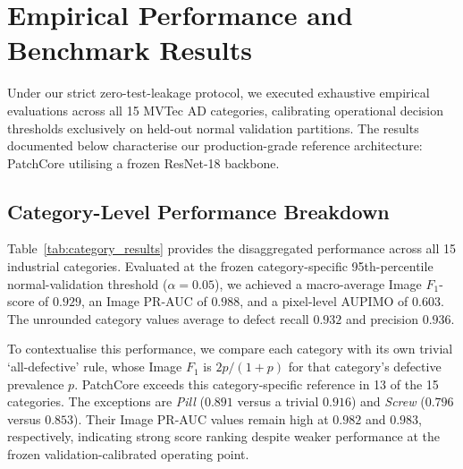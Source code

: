 \section{Empirical Performance and Benchmark Results}
\label{sec:empirical_results}

Under our strict zero-test-leakage protocol, we executed exhaustive empirical evaluations across all 15 MVTec AD categories, calibrating operational decision thresholds exclusively on held-out normal validation partitions. The results documented below characterise our production-grade reference architecture: PatchCore utilising a frozen ResNet-18 backbone.

\subsection{Category-Level Performance Breakdown}

Table~\ref{tab:category_results} provides the disaggregated performance across all 15 industrial categories. Evaluated at the frozen category-specific 95th-percentile normal-validation threshold ($\alpha=0.05$), we achieved a macro-average Image $F_1$-score of $0.929$, an Image PR-AUC of $0.988$, and a pixel-level AUPIMO of $0.603$. The unrounded category values average to defect recall $0.932$ and precision $0.936$.

To contextualise this performance, we compare each category with its own trivial `all-defective' rule, whose Image $F_1$ is $2p/(1+p)$ for that category's defective prevalence $p$. PatchCore exceeds this category-specific reference in 13 of the 15 categories. The exceptions are \emph{Pill} ($0.891$ versus a trivial $0.916$) and \emph{Screw} ($0.796$ versus $0.853$). Their Image PR-AUC values remain high at $0.982$ and $0.983$, respectively, indicating strong score ranking despite weaker performance at the frozen validation-calibrated operating point.

